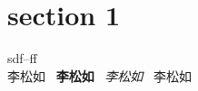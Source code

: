 \documentclass[12pt]{article}
\begin{document}
    \section{section 1}
        sdf--ff \\
        李松如 \ \textbf{李松如} \ \textit{李松如} \ \textsf{李松如}
\end{document}
